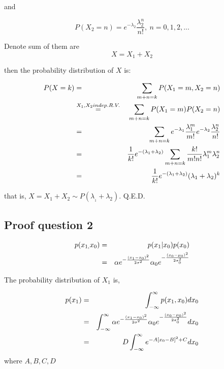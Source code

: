 \documentclass[english,11pt]{article}
\begin{document}
and

\begin{equation}
P(X_{2}=n)=e^{-\lambda_{2}}\frac{\lambda_{2}^{n}}{n!},\ n=0,1,2,...    
\end{equation}


Denote sum of them are 
\begin{equation}
X=X_{1}+X_{2}
\end{equation}

then the probability distribution of $X$ is:

\begin{eqnarray}
P(X=k) & = & \sum_{m+n=k}P(X_{1}=m,X_{2}=n) \notag \\
 & \overset{X_{1},X_{2}indep.R.V.}{=} & \sum_{m+n=k}P(X_{1}=m)P(X_{2}=n) \notag \\
 & = & \sum_{m+n=k}e^{-\lambda_{1}}\frac{\lambda_{1}^{m}}{m!}e^{-\lambda_{2}}\frac{\lambda_{2}^{n}}{n!} \notag \\
 & = & \frac{1}{k!}e^{-(\lambda_{1}+\lambda_{2})}\sum_{m+n=k}\frac{k!}{m!n!}\lambda_{1}^{m}\lambda_{2}^{n} \notag \\
 & = & \frac{1}{k!}e^{-(\lambda_{1}+\lambda_{2})}(\lambda_{1}+\lambda_{2})^{k}
\end{eqnarray}

that is, $X=X_{1}+X_{2}\sim P(\lambda_{_{1}}+\lambda_{2})$. Q.E.D.

\subsection{Proof question 2}

\begin{eqnarray}
p(x_{1,}x_{0}) & = & p(x_{1}|x_{0})p(x_{0}) \notag \\
 & = & \alpha e^{-\frac{(x_{1}-x_{0})^{2}}{2\sigma^{2}}}\alpha_{0}e^{-\frac{(x_{0}-\mu_{0})^{2}}{2\sigma_{0}^{2}}}
\end{eqnarray}

The probability distribution of $X_{1}$ is,

\begin{eqnarray}
p(x_{1}) & = & \int_{-\infty}^{\infty}p(x_{1},x_{0})dx_{0} \notag \\
 & = & \int_{-\infty}^{\infty}\alpha e^{-\frac{(x_{1}-x_{0})^{2}}{2\sigma^{2}}}\alpha_{0}e^{-\frac{(x_{0}-\mu_{0})^{2}}{2\sigma_{0}^{2}}}dx_{0} \notag \\
 & = & D\int_{-\infty}^{\infty}e^{-A[x_{0}-B]^{2}+C}dx_{0}
\end{eqnarray}
where $A,B,C,D$
\end{document}
